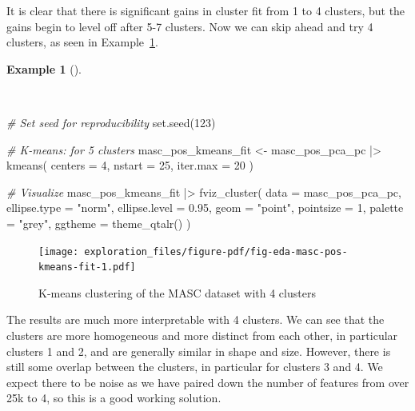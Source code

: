 \documentclass[
  letterpaper,
  DIV=11,
  numbers=noendperiod]{scrreport}
\newenvironment{Shaded}{\begin{snugshade}}{\end{snugshade}}
\newcommand{\AttributeTok}[1]{\textcolor[rgb]{0.00,0.00,0.00}{#1}}
\newcommand{\CommentTok}[1]{\textcolor[rgb]{0.00,0.00,0.00}{\textit{#1}}}
\newcommand{\DecValTok}[1]{\textcolor[rgb]{0.00,0.00,0.00}{#1}}
\newcommand{\FloatTok}[1]{\textcolor[rgb]{0.00,0.00,0.00}{#1}}
\newcommand{\FunctionTok}[1]{\textcolor[rgb]{0.00,0.00,0.00}{#1}}
\newcommand{\NormalTok}[1]{\textcolor[rgb]{0.00,0.00,0.00}{#1}}
\newcommand{\OtherTok}[1]{\textcolor[rgb]{0.00,0.00,0.00}{#1}}
\newcommand{\SpecialCharTok}[1]{\textcolor[rgb]{0.00,0.00,0.00}{#1}}
\newcommand{\StringTok}[1]{\textcolor[rgb]{0.00,0.00,0.00}{#1}}
\theoremstyle{definition}
\newtheorem{example}{Example}[chapter]
\theoremstyle{remark}
\begin{document}
It is clear that there is significant gains in cluster fit from 1 to 4
clusters, but the gains begin to level off after 5-7 clusters. Now we
can skip ahead and try 4 clusters, as seen in
Example~\ref{exm-eda-masc-pos-kmeans-fit}.

\begin{example}[]\protect\hypertarget{exm-eda-masc-pos-kmeans-fit}{}\label{exm-eda-masc-pos-kmeans-fit}

~

\begin{Shaded}
\begin{Highlighting}[]
\CommentTok{\# Set seed for reproducibility}
\FunctionTok{set.seed}\NormalTok{(}\DecValTok{123}\NormalTok{)}

\CommentTok{\# K{-}means: for 5 clusters}
\NormalTok{masc\_pos\_kmeans\_fit }\OtherTok{\textless{}{-}}
\NormalTok{  masc\_pos\_pca\_pc }\SpecialCharTok{|\textgreater{}}
  \FunctionTok{kmeans}\NormalTok{(}
    \AttributeTok{centers =} \DecValTok{4}\NormalTok{,}
    \AttributeTok{nstart =} \DecValTok{25}\NormalTok{,}
    \AttributeTok{iter.max =} \DecValTok{20}
\NormalTok{  )}

\CommentTok{\# Visualize}
\NormalTok{masc\_pos\_kmeans\_fit }\SpecialCharTok{|\textgreater{}} 
  \FunctionTok{fviz\_cluster}\NormalTok{(}
  \AttributeTok{data =}\NormalTok{ masc\_pos\_pca\_pc,}
  \AttributeTok{ellipse.type =} \StringTok{"norm"}\NormalTok{,}
  \AttributeTok{ellipse.level =} \FloatTok{0.95}\NormalTok{,}
  \AttributeTok{geom =} \StringTok{"point"}\NormalTok{,}
  \AttributeTok{pointsize =} \DecValTok{1}\NormalTok{,}
  \AttributeTok{palette =} \StringTok{"grey"}\NormalTok{,}
  \AttributeTok{ggtheme =} \FunctionTok{theme\_qtalr}\NormalTok{()}
\NormalTok{)}
\end{Highlighting}
\end{Shaded}

\begin{figure}[H]

{\centering \texttt{[image: exploration\_files/figure-pdf/fig-eda-masc-pos-kmeans-fit-1.pdf]}

}

\caption{\label{fig-eda-masc-pos-kmeans-fit}K-means clustering of the
MASC dataset with 4 clusters}

\end{figure}

\end{example}

The results are much more interpretable with 4 clusters. We can see that
the clusters are more homogeneous and more distinct from each other, in
particular clusters 1 and 2, and are generally similar in shape and
size. However, there is still some overlap between the clusters, in
particular for clusters 3 and 4. We expect there to be noise as we have
paired down the number of features from over 25k to 4, so this is a good
working solution.
\end{document}
